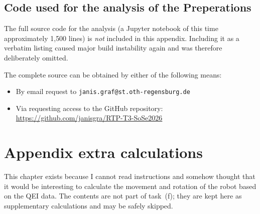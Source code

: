 \documentclass[12pt, oneside, a4paper]{scrreprt}
\begin{document}
            \cleardoublepage

            \section{Code used for the analysis of the Preperations}
            

                \begin{tcolorbox}[
                    colback=red!10,
                    colframe=red!70!black,
                    title=\textbf{Editorial note — Source code omitted},
                    fonttitle=\bfseries,
                    sharp corners=south,
                ]
                    The full source code for the analysis (a Jupyter notebook of this time approximately 1{,}500 lines) is \emph{not} included in this appendix. Including it as a verbatim listing caused major build instability again and was therefore deliberately omitted.

                    The complete source can be obtained by either of the following means:
                    \begin{itemize}
                        \item By email request to \texttt{janis.graf@st.oth-regensburg.de}
                        \item Via requesting access to the GitHub repository: \url{https://github.com/janisgra/RTP-T3-SoSe2026}
                    \end{itemize}
                \end{tcolorbox}
        
    \chapter{Appendix extra calculations}

        \begin{tcolorbox}[
            colback=gray!10,
            colframe=gray!70!black,
            title=\textbf{Editorial note --- out-of-scope appendix},
            fonttitle=\bfseries,
            sharp corners=south,
        ]
            This chapter exists because I cannot read instructions and somehow thought that it would be interesting to calculate the movement and rotation of the robot based on the QEI data. The contents are not part of task~(f); they are kept here as supplementary calculations and may be safely skipped.
        \end{tcolorbox}
\end{document}
